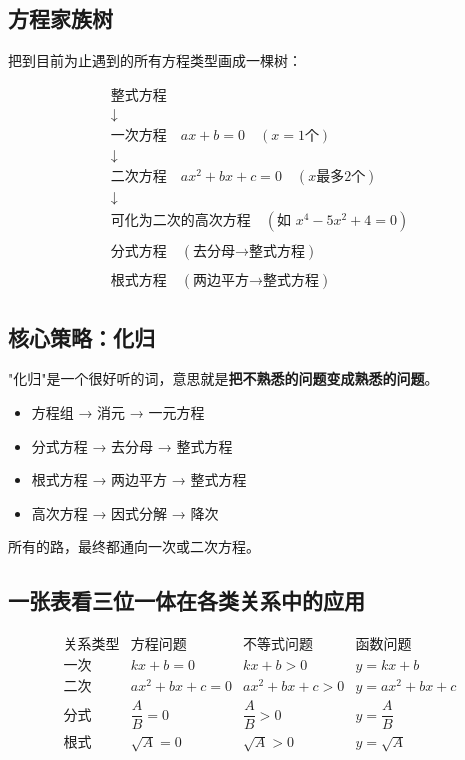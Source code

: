 
\subsection*{方程家族树}

把到目前为止遇到的所有方程类型画成一棵树：

\[
\begin{array}{c}
\text{整式方程} \\
\downarrow \\
\text{一次方程}\quad ax+b=0 \quad(x=1\text{个}) \\
\downarrow \\
\text{二次方程}\quad ax^2+bx+c=0 \quad(x\text{最多2个}) \\
\downarrow \\
\text{可化为二次的高次方程}\quad(\text{如 }x^4-5x^2+4=0) \\
\\
\text{分式方程}\quad(\text{去分母→整式方程}) \\
\\
\text{根式方程}\quad(\text{两边平方→整式方程})
\end{array}
\]

\subsection*{核心策略：化归}

"化归"是一个很好听的词，意思就是\textbf{把不熟悉的问题变成熟悉的问题}。

\begin{itemize}
  \item 方程组 → 消元 → 一元方程
  \item 分式方程 → 去分母 → 整式方程
  \item 根式方程 → 两边平方 → 整式方程
  \item 高次方程 → 因式分解 → 降次
\end{itemize}

所有的路，最终都通向一次或二次方程。

\subsection*{一张表看三位一体在各类关系中的应用}

\[
\begin{array}{c|c|c|c}
\text{关系类型} & \text{方程问题} & \text{不等式问题} & \text{函数问题} \\ \hline
\text{一次} & kx+b=0 & kx+b>0 & y=kx+b \\
\text{二次} & ax^2+bx+c=0 & ax^2+bx+c>0 & y=ax^2+bx+c \\
\text{分式} & \dfrac{A}{B}=0 & \dfrac{A}{B}>0 & y=\dfrac{A}{B} \\
\text{根式} & \sqrt{A}=0 & \sqrt{A}>0 & y=\sqrt{A}
\end{array}
\]

